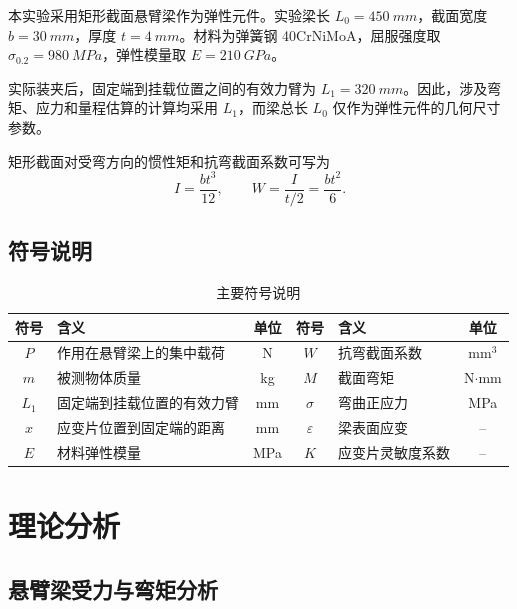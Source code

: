 \documentclass[UTF8,a4paper,zihao=5]{ctexart}
\begin{document}
本实验采用矩形截面悬臂梁作为弹性元件。实验梁长
\(L_0=\SI{450}{mm}\)，截面宽度 \(b=\SI{30}{mm}\)，厚度
\(t=\SI{4}{mm}\)。材料为弹簧钢 40CrNiMoA，屈服强度取
\(\sigma_{0.2}=\SI{980}{MPa}\)，弹性模量取
\(E=\SI{210}{GPa}\)。

实际装夹后，固定端到挂载位置之间的有效力臂为
\(L_1=\SI{320}{mm}\)。因此，涉及弯矩、应力和量程估算的计算均采用
\(L_1\)，而梁总长 \(L_0\) 仅作为弹性元件的几何尺寸参数。

矩形截面对受弯方向的惯性矩和抗弯截面系数可写为
\begin{equation}
  I=\frac{bt^3}{12}, \qquad W=\frac{I}{t/2}=\frac{bt^2}{6}.
  \label{eq:section-modulus}
\end{equation}

\subsection{符号说明}

\begin{table}[H]
  \centering
  \small
  \setlength{\tabcolsep}{3pt}
  \renewcommand{\arraystretch}{0.92}
  \begin{tabular}{c>{\raggedright\arraybackslash}p{3.8cm}cc>{\raggedright\arraybackslash}p{3.8cm}c}
    \toprule
    符号 & 含义 & 单位 & 符号 & 含义 & 单位 \\
    \midrule
    \(P\) & 作用在悬臂梁上的集中载荷 & N
    & \(W\) & 抗弯截面系数 & mm\(^3\) \\
    \(m\) & 被测物体质量 & kg
    & \(M\) & 截面弯矩 & N\(\cdot\)mm \\
    \(L_1\) & 固定端到挂载位置的有效力臂 & mm
    & \(\sigma\) & 弯曲正应力 & MPa \\
    \(x\) & 应变片位置到固定端的距离 & mm
    & \(\varepsilon\) & 梁表面应变 & -- \\
    \(E\) & 材料弹性模量 & MPa
    & \(K\) & 应变片灵敏度系数 & -- \\
    \bottomrule
  \end{tabular}
  \caption{主要符号说明}
\end{table}

\section{理论分析}

\subsection{悬臂梁受力与弯矩分析}
\end{document}
